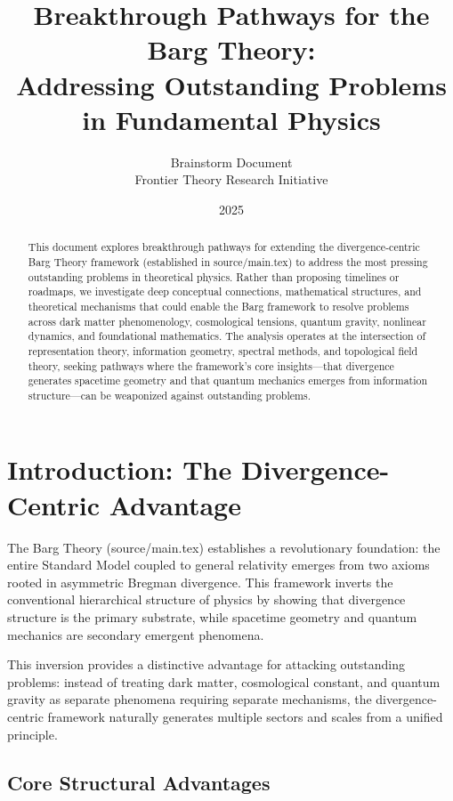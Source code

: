 \documentclass[12pt,a4paper]{article}
\title{Breakthrough Pathways for the Barg Theory:\\
Addressing Outstanding Problems in Fundamental Physics}
\author{Brainstorm Document\\
Frontier Theory Research Initiative}
\date{2025}
\begin{document}
\maketitle

\begin{abstract}
This document explores breakthrough pathways for extending the divergence-centric Barg Theory framework (established in source/main.tex) to address the most pressing outstanding problems in theoretical physics. Rather than proposing timelines or roadmaps, we investigate deep conceptual connections, mathematical structures, and theoretical mechanisms that could enable the Barg framework to resolve problems across dark matter phenomenology, cosmological tensions, quantum gravity, nonlinear dynamics, and foundational mathematics. The analysis operates at the intersection of representation theory, information geometry, spectral methods, and topological field theory, seeking pathways where the framework's core insights---that divergence generates spacetime geometry and that quantum mechanics emerges from information structure---can be weaponized against outstanding problems.
\end{abstract}

\tableofcontents
\clearpage

\section{Introduction: The Divergence-Centric Advantage}

The Barg Theory (source/main.tex) establishes a revolutionary foundation: the entire Standard Model coupled to general relativity emerges from two axioms rooted in asymmetric Bregman divergence. This framework inverts the conventional hierarchical structure of physics by showing that divergence structure is the primary substrate, while spacetime geometry and quantum mechanics are secondary emergent phenomena.

This inversion provides a distinctive advantage for attacking outstanding problems: instead of treating dark matter, cosmological constant, and quantum gravity as separate phenomena requiring separate mechanisms, the divergence-centric framework naturally generates multiple sectors and scales from a unified principle.

\subsection{Core Structural Advantages}
\end{document}
